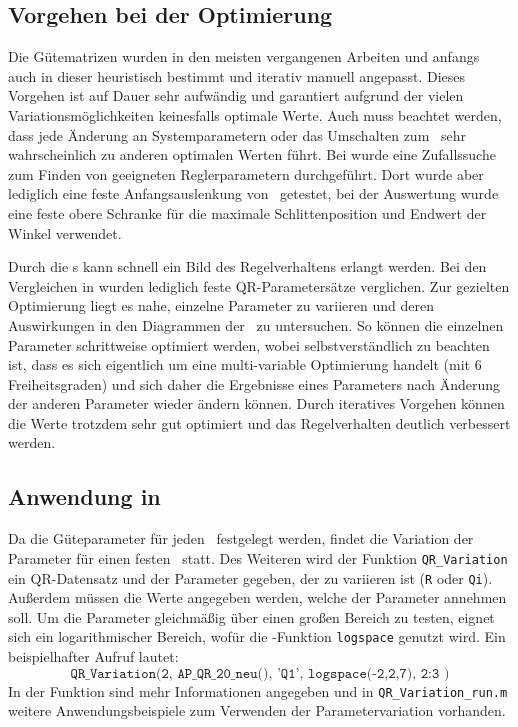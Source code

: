 \subsection{Vorgehen bei der Optimierung}

Die Gütematrizen wurden in den meisten vergangenen Arbeiten und anfangs auch in dieser heuristisch bestimmt und iterativ manuell angepasst.
Dieses Vorgehen ist auf Dauer sehr aufwändig und garantiert aufgrund der vielen Variationsmöglichkeiten keinesfalls optimale Werte.
Auch muss beachtet werden, dass jede Änderung an Systemparametern oder das Umschalten zum \beob\ sehr wahrscheinlich zu anderen optimalen Werten führt.
Bei \cite{chang} wurde eine Zufallssuche zum Finden von geeigneten Reglerparametern durchgeführt.
Dort wurde aber lediglich eine feste Anfangsauslenkung von \phz\ getestet, bei der Auswertung wurde eine feste obere Schranke für die maximale Schlittenposition und Endwert der Winkel verwendet.

Durch die \xots s  kann schnell ein Bild des Regelverhaltens erlangt werden.
Bei den Vergleichen in  wurden lediglich feste QR-Parametersätze verglichen.
Zur gezielten Optimierung liegt es nahe, einzelne Parameter zu variieren und deren Auswirkungen in den Diagrammen der \xots\ zu untersuchen.
So können die einzelnen Parameter schrittweise optimiert werden, wobei selbstverständlich zu beachten ist, dass es sich eigentlich um eine multi-variable Optimierung handelt (mit 6 Freiheitsgraden) und sich daher die Ergebnisse eines Parameters nach Änderung der anderen Parameter wieder ändern können.
Durch iteratives Vorgehen können die Werte trotzdem sehr gut optimiert und das Regelverhalten deutlich verbessert werden.


\subsection{Anwendung in \ml}

Da die Güteparameter für jeden \ap\ festgelegt werden, findet die Variation der Parameter für einen festen \ap\ statt.
Des Weiteren wird der Funktion \texttt{QR\_Variation} ein QR-Datensatz und der Parameter gegeben, der zu variieren ist (\texttt{R} oder \texttt{Qi}).
Außerdem müssen die Werte angegeben werden, welche der Parameter annehmen soll.
Um die Parameter gleichmäßig über einen großen Bereich zu testen, eignet sich ein logarithmischer Bereich, wofür die \ml-Funktion \texttt{logspace} genutzt wird. Ein beispielhafter Aufruf lautet:
	\[
	\texttt{QR\_Variation(2, AP\_QR\_20\_neu(), 'Q1', logspace(-2,2,7), 2:3 )}
\]
In der Funktion sind mehr Informationen angegeben und in \texttt{QR\_Variation\_run.m} weitere Anwendungsbeispiele zum Verwenden der Parametervariation vorhanden.

